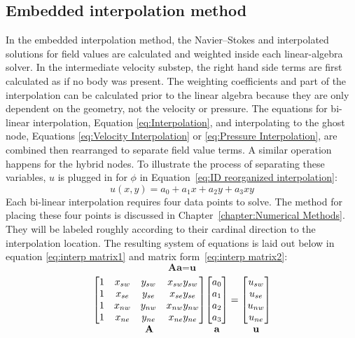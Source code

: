 \subsection{Embedded interpolation method}
\label{sec:ID embedded}
In the embedded interpolation method, the Navier--Stokes and interpolated solutions for field values are calculated and weighted inside each linear-algebra solver. 
In the intermediate velocity substep, the right hand side terms are first calculated as if no body was present. 
The weighting coefficients and part of the interpolation can be calculated prior to the linear algebra because they are only dependent on the geometry, not the velocity or pressure. 
The equations for bi-linear interpolation, Equation \eqref{eq:Interpolation}, and interpolating to the ghost node, Equations \eqref{eq:Velocity Interpolation} or \eqref{eq:Pressure Interpolation}, are combined then rearranged to separate field value terms. 
A similar operation happens for the hybrid nodes. 
To illustrate the process of separating these variables, $u$ is plugged in for $\phi$ in Equation~\eqref{eq:ID reorganized interpolation}:
\begin{equation}
u(x,y) = a_0 + a_1x +a_2y+a_3xy
\end{equation}
Each bi-linear interpolation requires four data points to solve. 
The method for placing these four points is discussed in Chapter~\ref{chapter:Numerical Methods}. 
They will be labeled roughly according to their cardinal direction to the interpolation location. 
The resulting system of equations is laid out below in equation \eqref{eq:interp matrix1} and matrix form~\eqref{eq:interp matrix2}:
\begin{equation}
\textbf{A}\textbf{a}=\textbf{u} \label{eq:interp matrix1}
\end{equation}
\begin{gather}
{\mathop{
\begin{bmatrix}
		  1&x_{sw}&y_{sw}&x_{sw}y_{sw}\\
		  1&x_{se}&y_{se}&x_{se}y_{se}\\
		  1&x_{nw}&y_{nw}&x_{nw}y_{nw}\\
		  1&x_{ne}&y_{ne}&x_{ne}y_{ne}
\end{bmatrix}
}_{\textstyle \textbf{A}}}
{\mathop{
\begin{bmatrix}
	a_0\\
	a_1\\
	a_2\\
	a_3
\end{bmatrix}
}_{\textstyle \textbf{a}\vphantom{A}}}
=
{\mathop{
\begin{bmatrix}
	u_{sw}\\
	u_{se}\\
	u_{nw}\\
	u_{ne}
\end{bmatrix}
}_{\textstyle \textbf{u}\vphantom{A}}}
\label{eq:interp matrix2}
\end{gather}
